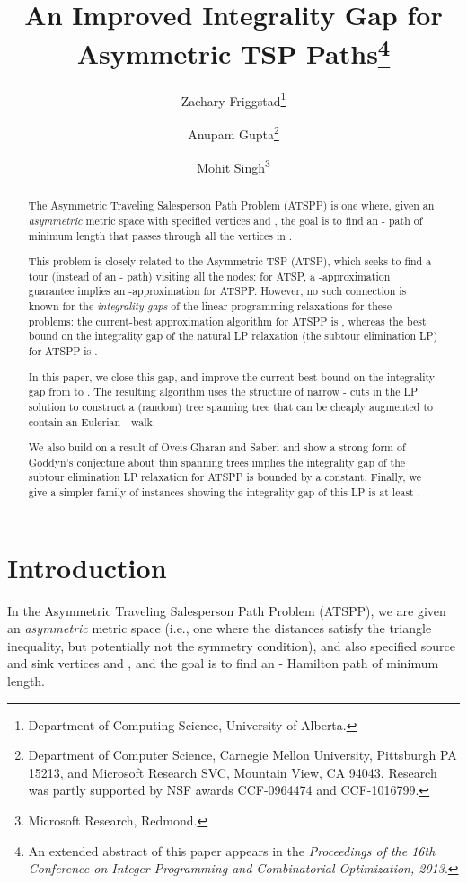 \documentclass[11pt]{article}
\title{An Improved Integrality Gap for Asymmetric TSP Paths\thanks{An
    extended abstract of this paper appears in the \emph{Proceedings of
      the 16th Conference on Integer Programming and Combinatorial
      Optimization, 2013}.}}
\author{
Zachary Friggstad\thanks{Department of Computing Science, University of Alberta.}
\and
Anupam Gupta\thanks{Department of Computer Science, Carnegie Mellon University, Pittsburgh
    PA 15213, and Microsoft Research SVC, Mountain View, CA
    94043. Research was partly supported by NSF awards CCF-0964474 and
    CCF-1016799.}
\and
Mohit Singh\thanks{Microsoft Research, Redmond.}
}
\theoremstyle{definition}
\begin{document}
\maketitle

\begin{abstract}

  \bigskip
  The Asymmetric Traveling Salesperson Path Problem (ATSPP) is one
  where, given an \emph{asymmetric} metric space  with specified
  vertices  and , the goal is to find an - path of minimum
  length that passes through all the vertices in .

  \medskip
  This problem is closely related to the Asymmetric TSP (ATSP),
  which seeks to find a tour (instead of an - path) visiting all
  the nodes: for ATSP, a -approximation guarantee implies an
  -approximation for ATSPP. However, no such connection is
  known for the \emph{integrality gaps} of the linear programming
  relaxations for these problems: the current-best approximation
  algorithm for ATSPP is , whereas the best bound
  on the integrality gap of the natural LP relaxation (the subtour
  elimination LP) for ATSPP is .

  \medskip
  In this paper, we close this gap, and improve the current best bound
  on the integrality gap from  to . The
  resulting algorithm uses the structure of narrow - cuts in the
  LP solution to construct a (random) tree spanning tree that can be cheaply augmented
  to contain an Eulerian - walk.

  \medskip
  We also build on a result of Oveis Gharan and Saberi and show
  a strong form of Goddyn's conjecture about thin spanning trees
  implies the integrality gap of the subtour elimination LP relaxation for ATSPP is bounded by a constant.
  Finally, we give a simpler family of instances showing the
  integrality gap of this LP is at least .
\end{abstract}





\section{Introduction}
\label{sec:introduction}

In the Asymmetric Traveling Salesperson Path Problem (ATSPP), we are
given an \emph{asymmetric} metric space  (i.e., one where the
distances satisfy the triangle inequality, but potentially not the
symmetry condition), and also specified source and sink vertices  and
, and the goal is to find an - Hamilton path of minimum length.
\end{document}
